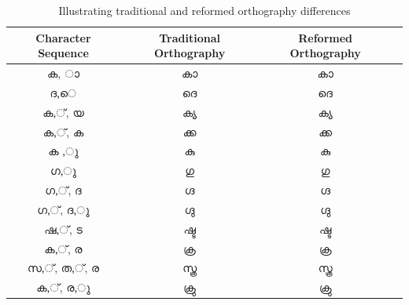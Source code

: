 \documentclass[10pt]{article}
\begin{document}
\begin{table}
	\centering
	
	\begin{tabular}{|c|c|c|c}
		\hline
		Character Sequence & Traditional Orthography & Reformed Orthography \\ \hline \hline
		{\manjari ക, ാ} & {\manjari കാ} & {\raghu കാ} \\
		\hline
		{\manjari ദ,െ} & {\manjari ദെ} & {\raghu ദെ}  \\
		\hline
		{\manjari ക,്, യ} & {\manjari ക്യ} & {\raghu ക്യ} \\
		\hline
		{\manjari ക,്, ക} & {\manjari ക്ക} & {\raghu ക്ക} \\
		\hline
		{\manjari ക ,ു} & {\manjari കു} & {\raghu കു} \\
		\hline
		{\manjari ഗ,ു} & {\manjari ഗു} & {\raghu ഗു} \\
		\hline
		{\manjari ഗ,്, ദ} & {\manjari ഗ്ദ} & {\raghu ഗ്ദ} \\
		\hline
		{\manjari ഗ,്, ദ,ു} & {\manjari ഗ്ദു} & {\raghu ഗ്ദു} \\
		\hline
		{\manjari ഷ,്, ട} & {\manjari ഷ്ട} & {\raghu ഷ്ട} \\	
		\hline
		{\manjari ക,്, ര} & {\manjari ക്ര} & {\raghu ക്ര} \\
		\hline
		{\manjari സ,്, ത,്, ര} & {\manjari സ്ത്ര} & {\raghu സ്ത്ര} \\
		\hline
		{\manjari ക,്, ര,ു} & {\manjari ക്രു} & {\raghu ക്രു} \\
		\hline
		
	\end{tabular}
	\caption{Illustrating traditional and reformed orthography differences}
	\label{orthographycomparison}
\end{table}
\end{document}
